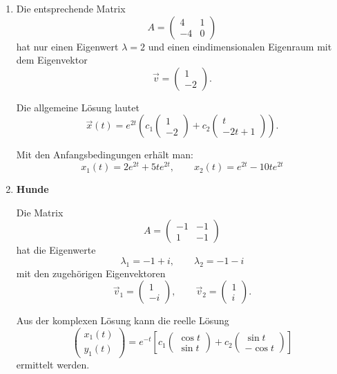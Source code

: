 \begin{enumerate}
    \item Die entsprechende Matrix
          \[
              A=\begin{pmatrix}
                  4  & 1 \\
                  -4 & 0
              \end{pmatrix}
          \]
          hat nur einen Eigenwert \(\lambda=2\) und einen
          eindimensionalen Eigenraum mit dem Eigenvektor
          \[
              \vec{v}=\begin{pmatrix}1\\-2\end{pmatrix}.
          \]

          Die allgemeine Lösung lautet
          \[
              \vec{x}(t)=e^{2t}
              \left(
              c_1\begin{pmatrix}1\\-2\end{pmatrix}
              +c_2\begin{pmatrix}t\\-2t+1\end{pmatrix}
              \right).
          \]

          Mit den Anfangsbedingungen erhält man:
          \[
              \boxed{
                  x_1(t)=2e^{2t}+5te^{2t},
                  \qquad
                  x_2(t)=e^{2t}-10te^{2t}
              }
          \]

    \item \textbf{Hunde}

          Die Matrix
          \[
              A=\begin{pmatrix}
                  -1 & -1 \\
                  1  & -1
              \end{pmatrix}
          \]
          hat die Eigenwerte
          \[
              \lambda_1=-1+i,\qquad
              \lambda_2=-1-i
          \]
          mit den zugehörigen Eigenvektoren
          \[
              \vec{v}_1=\begin{pmatrix}1\\-i\end{pmatrix},
              \qquad
              \vec{v}_2=\begin{pmatrix}1\\i\end{pmatrix}.
          \]

          Aus der komplexen Lösung kann die reelle Lösung
          \[
              \begin{pmatrix}x_1(t)\\y_1(t)\end{pmatrix}
              =
              e^{-t}\left[
                  c_1
                  \begin{pmatrix}\cos t\\\sin t\end{pmatrix}
                  +
                  c_2
                  \begin{pmatrix}\sin t\\-\cos t\end{pmatrix}
                  \right]
          \]
          ermittelt werden.


\end{enumerate}
